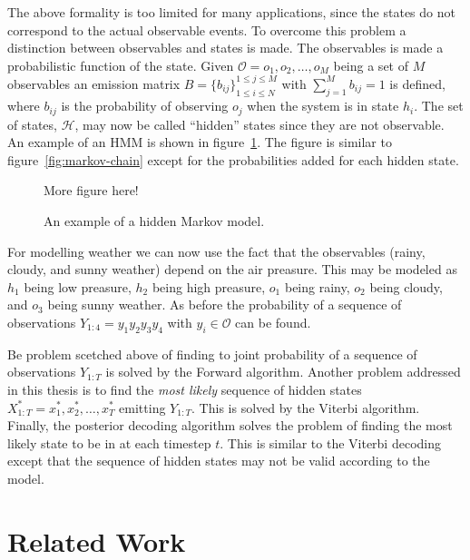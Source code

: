 The above formality is too limited for many applications, since the states do
not correspond to the actual observable events. To overcome this problem a
distinction between observables and states is made. The observables is made a
probabilistic function of the state. Given
$\mathcal{O} = {o_1, o_2, \dots, o_M}$ being a set of $M$ observables an
emission matrix $B = {\{b_{ij}\}}_{1 \le i \le N}^{1 \le j \le M}$ with
$\sum_{j=1}^M b_{ij} = 1$ is defined, where $b_{ij}$ is the probability of
observing $o_j$ when the system is in state $h_i$. The set of states,
$\mathcal{H}$, may now be called ``hidden'' states since they are not
observable. An example of an HMM is shown in
figure~\ref{fig:hidden-markov-model}. The figure is similar to
figure~\ref{fig:markov-chain} except for the probabilities added for each
hidden state.

\begin{figure}
  \centering
  More figure here!
  \caption{An example of a hidden Markov model.}
  \label{fig:hidden-markov-model}
\end{figure}

For modelling weather we can now use the fact that the observables (rainy,
cloudy, and sunny weather) depend on the air preasure. This may be modeled as
$h_1$ being low preasure, $h_2$ being high preasure, $o_1$ being rainy, $o_2$
being cloudy, and $o_3$ being sunny weather. As before the probability of a
sequence of observations $Y_{1:4} = y_1y_2y_3y_4$ with $y_i \in \mathcal{O}$
can be found.

Be problem scetched above of finding to joint probability of a sequence of
observations $Y_{1:T}$ is solved by the Forward algorithm. Another problem
addressed in this thesis is to find the \emph{most likely} sequence of hidden
states $X_{1:T}^* = x_1^*, x_2^*, \dots, x_T^*$ emitting $Y_{1:T}$. This is
solved by the Viterbi algorithm. Finally, the posterior decoding algorithm
solves the problem of finding the most likely state to be in at each timestep
$t$. This is similar to the Viterbi decoding except that the sequence of hidden
states may not be valid according to the model.

\section{Related Work}

